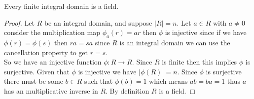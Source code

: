 \documentclass[16pt,a4paper]{article}
\theoremstyle{definition}
\begin{document}
\newpage
\begin{thm}{}{}
Every finite integral domain is a field.
\end{thm}

\begin{proof}
Let $R$ be an integral domain, and suppose $|R|=n$. Let $a\in R$ with $a\neq 0$ consider the multiplication map $\phi_a(r) = ar$ then $\phi$ is injective since if we have $\phi(r)=\phi(s)$ then $ra=sa$ since $R$ is an integral domain we can use the cancellation property to get $r=s$.
\\
So we have an injective function $\phi:R\rightarrow R$. Since $R$ is finite then this implies $\phi$ is surjective. Given that $\phi$ is injective we have $|\phi(R)|=n$. Since $\phi$ is surjective there must be some $b\in R$ such that $\phi(b) = 1$ which means $ab=ba = 1$ thus $a$ has an multiplicative inverse in $R$. By definition $R$ is a field.  
\end{proof}














































 
\end{document}

